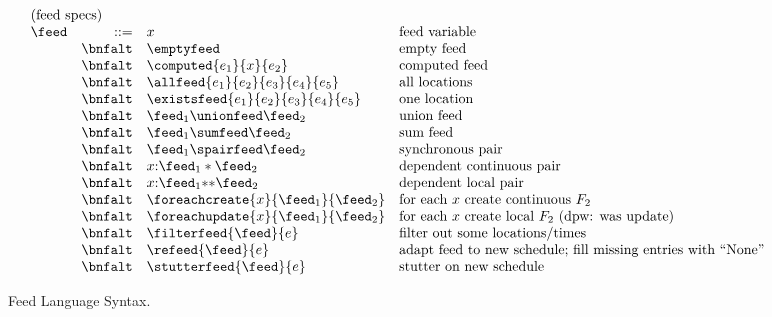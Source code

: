 \begin{figure*}[t]
\[
\begin{array}{lrll}
\multicolumn{4}{l}{\mbox{(feed specs)}}\\ 
\feed & ::=     & x &  \mbox{feed variable} \\
 & \bnfalt & \emptyfeed & \mbox{empty feed} \\
 & \bnfalt & \computed{e_1}{x}{e_2} & \mbox{computed feed} \\
 & \bnfalt & \allfeed{e_1}{e_2}{e_3}{e_4}{e_5} & \mbox{all locations} \\
 & \bnfalt & \existsfeed{e_1}{e_2}{e_3}{e_4}{e_5} & \mbox{one location} \\
 & \bnfalt & \feed_1 \unionfeed \feed_2 & \mbox{union feed} \\
 & \bnfalt & \feed_1 \sumfeed \feed_2 & \mbox{sum feed} \\
 & \bnfalt & \feed_1 \spairfeed \feed_2 & \mbox{synchronous pair} \\
 & \bnfalt & x{:}\feed_1 * \feed_2 & \mbox{dependent continuous pair} \\
 & \bnfalt & x{:}\feed_1 {*}{*} \feed_2 & \mbox{dependent local pair} \\
 & \bnfalt & \foreachcreate{x}{\feed_1}{\feed_2} & \mbox{for each $x$ create continuous $F_2$} \\
 & \bnfalt & \foreachupdate{x}{\feed_1}{\feed_2} & \mbox{for each $x$ create local $F_2$ (dpw: was update)} \\
 & \bnfalt & \filterfeed{\feed}{e} & \mbox{filter out some locations/times} \\
 & \bnfalt & \refeed{\feed}{e} & \mbox{adapt feed to new schedule; 
                                               fill missing entries with ``None''} \\
 & \bnfalt & \stutterfeed{\feed}{e} & \mbox{stutter on new schedule} \\

\end{array}
\]
\caption{Feed Language Syntax.}
\label{fig:syntax}
\end{figure*}


